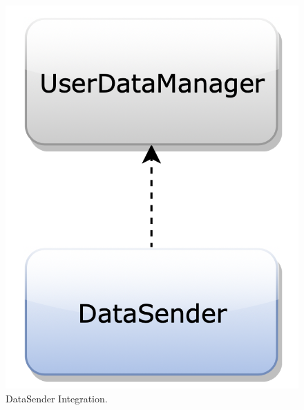 \begin{figure}[H]
\begin{center}
\begin{minipage}[c]{.40\textwidth}
\includegraphics[scale=0.35]{Images/IntegrationPlanImages/fig8.png}
\caption{DataSender Integration.}
        \end{minipage}
      \end{center}
\end{figure}

